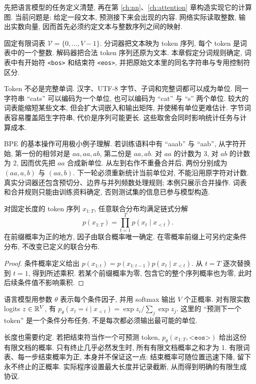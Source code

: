 \label{ch:lm}
\label{sec:lm-tokens}
先把语言模型的任务定义清楚, 再在第 \ref{ch:nn}、\ref{ch:attention} 章构造实现它的计算图. 当前问题是: 给定一段文本, 预测接下来会出现的内容. 网络实际读取整数, 输出实数向量, 因而首先必须约定文本与整数序列之间的映射.

\begin{definition}
固定有限词表 $\mathcal V=\{0,\ldots,V-1\}$. 分词器把文本映为 token 序列, 每个 token 是词表中的一个整数. 解码器把合法 token 序列还原为文本. 本章假定分词规则确定, 词表中有开始符 \texttt{<bos>} 和结束符 \texttt{<eos>}, 并把原始文本里的同名字符串与专用控制符区分.
\end{definition}
Token 不必是完整单词. 汉字、UTF-8 字节、子词和完整词都可以成为单位. 同一字符串 ``cats'' 可以编码为一个单位, 也可以编码为 ``cat'' 与 ``s'' 两个单位. 较大的词表能缩短某些文本, 但会扩大词嵌入和输出矩阵, 并使稀有单位更难估计. 字节词表容易覆盖陌生字符串, 代价是序列可能更长. 这些取舍会同时影响统计任务与计算成本.

BPE 的基本操作可用极小例子理解. 若训练语料中有 ``aaab'' 与 ``aab'', 从字符开始, 第一份的相邻对是 $aa,aa,ab$, 第二份是 $aa,ab$. 对 $aa$ 的计数为 3, 对 $ab$ 的计数为 2, 因而优先把 $aa$ 合成新单位. 从左到右作不重叠合并后, 两份分别成为 $(aa,a,b)$ 与 $(aa,b)$. 下一轮必须重新统计当前单位对, 不能沿用原字符对计数. 真实分词器还包含预切分、边界与并列频数处理规则; 本例只展示合并操作. 词表和合并规则只能由训练资料确定, 否则测试集的信息已参与模型构造.

\begin{proposition}
对固定长度的 token 序列 $x_{1:T}$, 任意联合分布均满足链式分解
\[
p(x_{1:T})=\prod_{t=1}^T p(x_t\mid x_{<t}).
\]
在前缀概率为正的地方, 因子由联合概率唯一确定. 在零概率前缀上可另约定条件分布, 不改变已定义的联合分布.
\end{proposition}
\begin{proof}
条件概率定义给出 $p(x_{1:t})=p(x_{1:t-1})p(x_t\mid x_{<t})$. 从 $t=T$ 逐次替换到 $t=1$, 得到所述乘积. 若某个前缀概率为零, 包含它的整个序列概率也为零, 此时后续条件值不影响乘积.
\end{proof}
语言模型用参数 $\theta$ 表示每个条件因子, 并用 softmax 输出 $V$ 个正概率. 对有限实数 logits $z\in\mathbb R^V$, 有 $p_\theta(x_t=i\mid x_{<t})=\exp z_i/\sum_j\exp z_j$. 这里的 ``预测下一个 token'' 是一个条件分布任务, 不是每次都必须输出最可能的单位.

长度也需要约定. 若把结束符当作一个可预测 token, $p_\theta(x_{1:T},\texttt{<eos>})$ 给出这份有限文档的概率. 只有终止几乎必然发生时, 所有有限文档概率之和才为 1. 有限词表、每一步结束概率为正, 本身并不保证这一点: 结束概率可随位置迅速下降, 留下永不终止的正概率. 实际程序设置最大长度并记录截断, 从而得到明确的有限生成协议.

